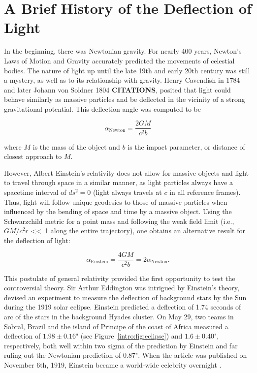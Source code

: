 \section{A Brief History of the Deflection of Light}

In the beginning, there was Newtonian gravity. For nearly 400 years, Newton's Laws of Motion and Gravity accurately predicted the movements of celestial bodies. The nature of light up until the late 19th and early 20th century was still a mystery, as well as to its relationship with gravity. Henry Cavendish in 1784 and later Johann von Soldner 1804 \textbf{CITATIONS}, posited that light could behave similarly as massive particles and be deflected in the vicinity of a strong gravitational potential. This deflection angle was computed to be

\begin{equation}
\alpha_\mathrm{Newton} = \frac{2GM}{c^2b}
\end{equation}

\noindent where $M$ is the mass of the object and $b$ is the impact parameter, or distance of closest approach to $M$.

However, Albert Einstein's relativity does not allow for massive objects and light to travel through space in a similar manner, as light particles always have a spacetime interval of $ds^2=0$ (light always travels at $c$ in all reference frames). Thus, light will follow unique geodesics to those of massive particles when influenced by the bending of space and time by a massive object. Using the Schwarzchild metric for a point mass and following the weak field limit (i.e., $GM/c^2r$ \textless \textless\ 1 along the entire trajectory), one obtains an alternative result for the deflection of light:

\begin{equation}
\alpha_\mathrm{Einstein} = \frac{4GM}{c^2b} =  2\alpha_\mathrm{Newton}.
\label{intro:eqn:deflection}
\end{equation}

This postulate of general relativity provided the first opportunity to test the controversial theory. Sir Arthur Eddington was intrigued by Einstein's theory, devised an experiment to measure the deflection of background stars by the Sun during the 1919 solar eclipse. Einstein predicted a deflection of 1.74 seconds of arc of the stars in the background Hyades cluster. On May 29, two teams in Sobral, Brazil and the island of Principe of the coast of Africa measured a deflection of $1.98\pm0.16$" (see Figure~\ref{intro:fig:eclipse}) and $1.6\pm0.40$", respectively, both well within two sigma of the prediction by Einstein and far ruling out the Newtonian prediction of 0.87". When the article was published on November 6th, 1919, Einstein became a world-wide celebrity overnight \citep{Dyson:1920zl}.

